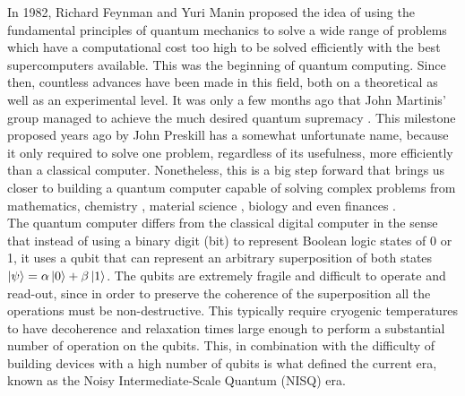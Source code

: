 In 1982, Richard Feynman and Yuri Manin proposed \cite{Feynman1982} the idea of using the fundamental principles of quantum mechanics to solve a wide range of problems which have a computational cost too high to be solved efficiently with the best supercomputers available. This was the beginning of quantum computing. Since then, countless advances have been made in this field, both on a theoretical as well as an experimental level. It was only a few months ago that John Martinis' group managed to achieve the much desired quantum supremacy \cite{Arute2019}. This milestone proposed years ago by John Preskill \cite{Preskill2012} has a somewhat unfortunate name, because it only required to solve one problem, regardless of its usefulness, more efficiently than a classical computer. Nonetheless, this is a big step forward that brings us closer to building a quantum computer capable of solving complex problems from mathematics\cite{Wang2005}, chemistry \cite{ArgueelloLuengo2019}, material science \cite{Itoh2014}, biology \cite{Arndt2009} and even finances \cite{Haven2002}.\\

The quantum computer differs from the classical digital computer in the sense that instead of using a binary digit (bit) to represent Boolean logic states of 0 or 1, it uses a qubit that can represent an arbitrary superposition of both states $\ket{\psi}=\alpha\ket{0} +\beta\ket{1}$. The qubits are extremely fragile and difficult to operate and read-out, since in order to preserve the coherence of the superposition all the operations must be non-destructive. This typically require cryogenic temperatures to have decoherence and relaxation times large enough to perform a substantial number of operation on the qubits. This, in combination with the difficulty of building devices with a high number of qubits is what defined the current era, known as the Noisy Intermediate-Scale Quantum (NISQ) era.\\

